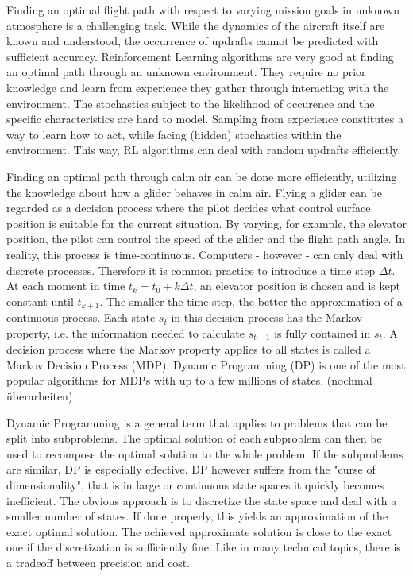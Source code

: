 Finding an optimal flight path with respect to varying mission goals in unknown atmosphere is a challenging task. While the dynamics of the aircraft itself are known and understood, the occurrence of updrafts cannot be predicted with sufficient accuracy. Reinforcement Learning algorithms are very good at finding an optimal path through an unknown environment. They require no prior knowledge and learn from experience they gather through interacting with the environment. The stochastics subject to the likelihood of occurence and the specific characteristics are hard to model. Sampling from experience constitutes a way to learn how to act, while facing (hidden) stochastics within the environment.  This way, RL algorithms can deal with random updrafts efficiently.

Finding an optimal path through calm air can be done more efficiently, utilizing the knowledge about how a glider behaves in calm air. Flying a glider can be regarded as a decision process where the pilot decides what control surface position is suitable for the current situation. By varying, for example, the elevator position, the pilot can control the speed of the glider and the flight path angle. In reality, this process is time-continuous. Computers - however - can only deal with discrete processes. Therefore it is common practice to introduce a time step $\Delta t$. At each moment in time $t_k = t_0 + k\Delta t$, an elevator position is chosen and is kept constant until $t_{k+1}$. The smaller the time step, the better the approximation of a continuous process. Each state $s_t$ in this decision process has the Markov property, i.e. the information needed to calculate $s_{t+1}$ is fully contained in $s_t$. A decision process where the Markov property applies to all states is called a Markov Decision Process (MDP). Dynamic Programming (DP) is one of the most popular algorithms for MDPs with up to a few millions of states. (nochmal überarbeiten)

Dynamic Programming is a general term that applies to problems that can be split into subproblems. The optimal solution of each subproblem can then be used to recompose the optimal solution to the whole problem. If the subproblems are similar, DP is especially effective. DP however suffers from the "curse of dimensionality", that is in large or continuous state spaces it quickly becomes inefficient. The obvious approach is to discretize the state space and deal with a smaller number of states. If done properly, this yields an approximation of the exact optimal solution. The achieved approximate solution is close to the exact one if the discretization is sufficiently fine. Like in many technical topics, there is a tradeoff between precision and cost.

